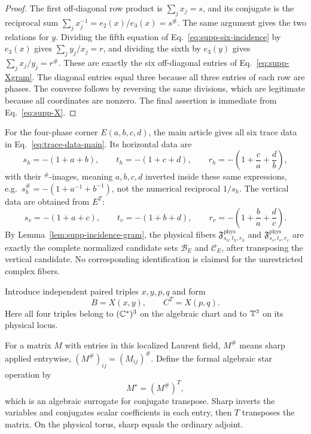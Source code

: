\begin{proof}
The first off-diagonal row product is $\sum_jx_j=s$, and its conjugate is the reciprocal sum $\sum_jx_j^{-1}=e_2(x)/e_3(x)=s^\#$.  The same argument gives the two relations for $y$.  Dividing the fifth equation of Eq.~\eqref{eq:supp-six-incidence} by $e_3(x)$ gives $\sum_jy_j/x_j=r$, and dividing the sixth by $e_3(y)$ gives $\sum_jx_j/y_j=r^\#$. These are exactly the six off-diagonal entries of Eq.~\eqref{eq:supp-Xgram}. The diagonal entries equal three because all three entries of each row are phases.  The converse follows by reversing the same divisions, which are legitimate because all coordinates are nonzero.  The final assertion is immediate from Eq.~\eqref{eq:supp-X}.
\end{proof}


For the four-phase corner $E(a,b,c,d)$, the main article gives all six trace data in Eq.~\eqref{eq:trace-data-main}.  Its horizontal data are
\begin{equation}
s_h=-(1+a+b),\qquad t_h=-(1+c+d),\qquad
r_h=-\left(1+\frac ca+\frac db\right),
\label{eq:supp-horizontal-data}
\end{equation}
with their $^{\#}$-images, meaning $a,b,c,d$ inverted inside these same expressions, e.g.\ $s_h^\#=-(1+a^{-1}+b^{-1})$, not the numerical reciprocal $1/s_h$.  The vertical data are obtained from $E^T$:
\begin{equation}
s_v=-(1+a+c),\qquad t_v=-(1+b+d),\qquad
r_v=-\left(1+\frac ba+\frac dc\right).
\label{eq:supp-vertical-data}
\end{equation}
By Lemma~\ref{lem:supp-incidence-gram}, the physical fibers $\mathfrak F^{\mathrm{phys}}_{s_h,t_h,r_h}$ and $\mathfrak F^{\mathrm{phys}}_{s_v,t_v,r_v}$ are exactly the complete normalized candidate sets $\mathcal B_E$ and $\mathcal C_E$, after transposing the vertical candidate.  No corresponding identification is claimed for the unrestricted complex fibers.

Introduce independent paired triples $x,y,p,q$ and form
\begin{equation}
B=X(x,y),\qquad C^T=X(p,q).
\label{eq:supp-BC}
\end{equation}
Here all four triples belong to $(\mathbb C^*)^3$ on the algebraic chart and to $\mathbb T^3$ on its physical locus.

For a matrix $M$ with entries in this localized Laurent field, $M^\#$ means sharp applied entrywise, $(M^\#)_{ij}=(M_{ij})^\#$. Define the formal algebraic star operation by
\begin{equation}
M^\star=(M^\#)^T,
\label{eq:supp-formal-star}
\end{equation}
which is an algebraic surrogate for conjugate transpose. Sharp inverts the variables and conjugates scalar coefficients in each entry, then $T$ transposes the matrix. On the physical torus, sharp equals the ordinary adjoint.

